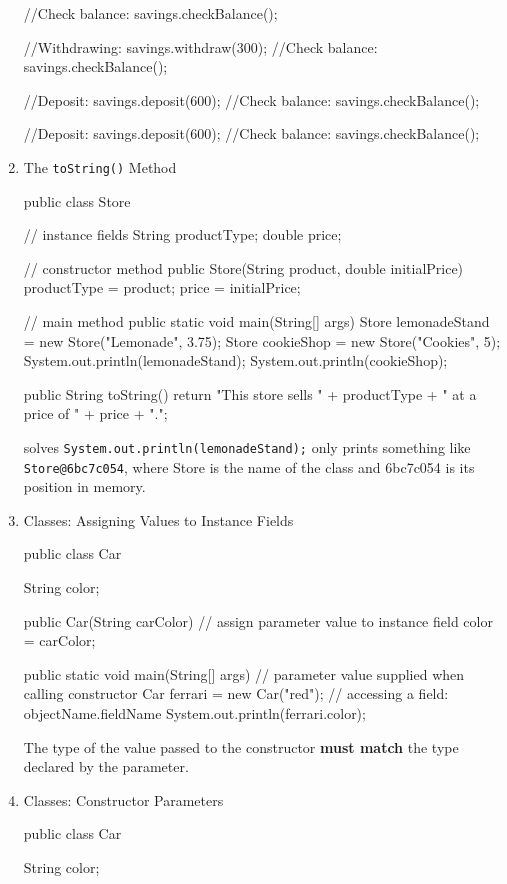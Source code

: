 \documentclass[a4paper,12pt]{article}
\begin{document}
\begin{enumerate}
\begin{javacode}
{{    //Check balance:
    savings.checkBalance();

    //Withdrawing:
    savings.withdraw(300);
    //Check balance:
    savings.checkBalance();

    //Deposit:
    savings.deposit(600);
    //Check balance:
    savings.checkBalance();

    //Deposit:
    savings.deposit(600);
    //Check balance:
    savings.checkBalance();
  }
}
\end{javacode}

\item The \verb|toString()| Method
\begin{javacode}
public class Store {
  // instance fields
  String productType;
  double price;
  
  // constructor method
  public Store(String product, double initialPrice) {
    productType = product;
    price = initialPrice;
  }

  // main method
  public static void main(String[] args) {
    Store lemonadeStand = new Store("Lemonade", 3.75);
    Store cookieShop = new Store("Cookies", 5);
    System.out.println(lemonadeStand);
    System.out.println(cookieShop);
  }
  	
  public String toString() {
    return "This store sells " + productType + " at a price of " + price + ".";
  }
}
\end{javacode}
solves \verb|System.out.println(lemonadeStand);| only prints something like \verb|Store@6bc7c054|, where Store is the name of the class and 6bc7c054 is its position in memory.

\item Classes: Assigning Values to Instance Fields
\begin{javacode}
public class Car {
  String color;

  public Car(String carColor) {
    // assign parameter value to instance field
    color = carColor;
  }

  public static void main(String[] args) {
    // parameter value supplied when calling constructor
    Car ferrari = new Car("red");
		// accessing a field: objectName.fieldName
    System.out.println(ferrari.color);
  }
}
\end{javacode}
The type of the value passed to the constructor \textbf{must match} the type declared by the parameter.

\item Classes: Constructor Parameters
\begin{javacode}
public class Car {
  String color;

}
\end{javacode}
\end{enumerate}
\end{document}
